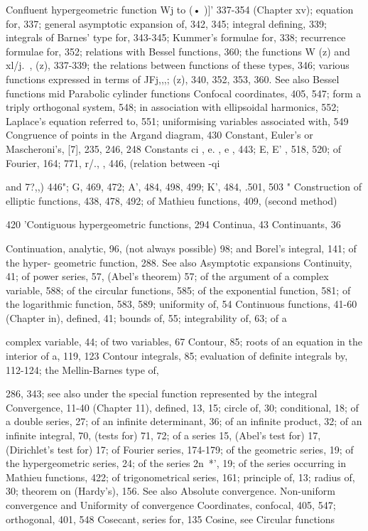 Confluent hypergeometric function  Wj  to (• )]' 337-354 (Chapter xv); equation for, 337; general
asymptotic expansion of, 342, 345; integral defining, 339; integrals of Barnes' type for,
343-345; Kummer's formulae for, 338; recurrence formulae for, 352; relations with Bessel
functions, 360; the functions W    (z) and xl/j.\ ,  (z), 337-339; the relations between functions
of these types, 346; various functions expressed in terms of JFj,,,; (z), 340, 352, 353, 360. See
also Bessel functions mid Parabolic cylinder functions
Confocal coordinates, 405, 547; form a triply orthogonal system, 548; in association with
ellipsoidal harmonics, 552; Laplace's equation referred to, 551; uniformising variables
associated with, 549
Congruence of points in the Argand diagram, 430
Constant, Euler's or Mascheroni's, [7], 235, 246, 248
Constants ci , e. , e , 443; E, E' , 518, 520; of Fourier, 164; 771, r/., , 446, (relation between -qi

and 7?,,) 446"; G, 469, 472; A', 484, 498, 499; K', 484, .501, 503 "
Construction of elliptic functions, 438, 478, 492; of Mathieu functions, 409, (second method)

420
'Contiguous hypergeometric functions, 294
Continua, 43
Continuants, 36

Continuation, analytic, 96, (not always possible) 98; and Borel's integral, 141; of the hyper-
geometric function, 288. See also Asymptotic expansions
Continuity, 41; of power series, 57, (Abel's theorem) 57; of the argument of a complex variable,
588; of the circular functions, 585; of the exponential function, 581; of the logarithmic
function, 583, 589; uniformity of, 54
Continuous functions, 41-60 (Chapter in), defined, 41; bounds of, 55; integrability of, 63; of a

complex variable, 44; of two variables, 67
Contour, 85; roots of an equation in the interior of a, 119, 123
Contour integrals, 85; evaluation of definite integrals by, 112-124; the Mellin-Barnes type of,

286, 343; see also under the special function represented by the integral
Convergence, 11-40 (Chapter 11), defined, 13, 15; circle of, 30; conditional, 18; of a double
series, 27; of an infinite determinant, 36; of an infinite product, 32; of an infinite integral,
70, (tests for) 71, 72; of a series 15, (Abel's test for) 17, (Dirichlet's test for) 17; of Fourier
series, 174-179; of the geometric series, 19; of the hypergeometric series, 24; of the series
2n~*', 19; of the series occurring in Mathieu functions, 422; of trigonometrical series, 161;
principle of, 13; radius of, 30; theorem on (Hardy's), 156. See also Absolute convergence.
Non-uniform convergence and Uniformity of convergence
Coordinates, confocal, 405, 547; orthogonal, 401, 548
Cosecant, series for, 135
Cosine, see Circular functions


